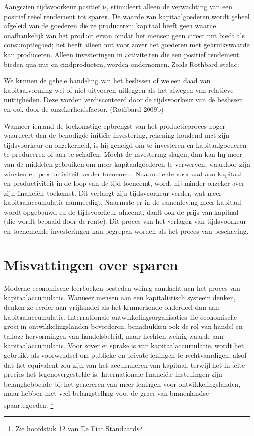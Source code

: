 \documentclass[
  a5paper,
  smalldemyvopaper,11pt,twoside,onecolumn,openright,extrafontsizes,
hidelinks]{memoir}
\begin{document}
Aangezien tijdsvoorkeur positief is, stimuleert alleen de verwachting
van een positief reëel rendement tot sparen. De waarde van
kapitaalgoederen wordt geheel afgeleid van de goederen die ze
produceren; kapitaal heeft geen waarde onafhankelijk van het product
ervan omdat het mensen geen direct nut biedt als consumptiegoed; het
heeft alleen nut voor zover het goederen met gebruikswaarde kan
produceren. Alleen investeringen in activiteiten die een positief
rendement bieden qua nut en eindproducten, worden ondernomen. Zoals
Rothbard stelde:

We kunnen de gehele handeling van het beslissen of we een daad van
kapitaalvorming wel of niet uitvoeren uitleggen als het afwegen van
relatieve nuttigheden. Deze worden verdisconteerd door de tijdsvoorkeur
van de beslisser en ook door de onzekerheidsfactor. (Rothbard 2009b)

Wanneer iemand de toekomstige opbrengst van het productieproces hoger
waardeert dan de benodigde initiële investering, rekening houdend met
zijn tijdsvoorkeur en onzekerheid, is hij geneigd om te investeren en
kapitaalgoederen te produceren of aan te schaffen. Mocht de investering
slagen, dan kan hij meer van de middelen gebruiken om meer
kapitaalgoederen te verwerven, waardoor zijn winsten en productiviteit
verder toenemen. Naarmate de voorraad aan kapitaal en productiviteit in
de loop van de tijd toeneemt, wordt hij minder onzeker over zijn
financiële toekomst. Dit verlaagt zijn tijdsvoorkeur verder, wat meer
kapitaalaccumulatie aanmoedigt. Naarmate er in de samenleving meer
kapitaal wordt opgebouwd en de tijdsvoorkeur afneemt, daalt ook de prijs
van kapitaal (die wordt bepaald door de rente). Dit proces van het
verlagen van tijdsvoorkeur en toenemende investeringen kan begrepen
worden als het proces van beschaving.

\section{Misvattingen over sparen}\label{misvattingen-over-sparen}

Moderne economische leerboeken besteden weinig aandacht aan het proces
van kapitaalaccumulatie. Wanneer mensen aan een kapitalistisch systeem
denken, denken ze eerder aan vrijhandel als het kenmerkende onderdeel
dan aan kapitaalaccumulatie. Internationale ontwikkelingsorganisaties
die economische groei in ontwikkelingslanden bevorderen, benadrukken ook
de rol van handel en talloze hervormingen van handelsbeleid, maar
hechten weinig waarde aan kapitaalaccumulatie. Voor zover er sprake is
van kapitaalaccumulatie, wordt het gebruikt als voorwendsel om publieke
en private leningen te rechtvaardigen, alsof dat het equivalent zou zijn
van het accumuleren van kapitaal, terwijl het in feite precies het
tegenovergestelde is. Internationale financiële instellingen zijn
belanghebbende bij het genereren van meer leningen voor
ontwikkelingslanden, maar hebben niet veel belangstelling voor de groei
van binnenlandse spaartegoeden. \footnote{Zie hoofdstuk 12 van De Fiat
  Standaard}
\end{document}
